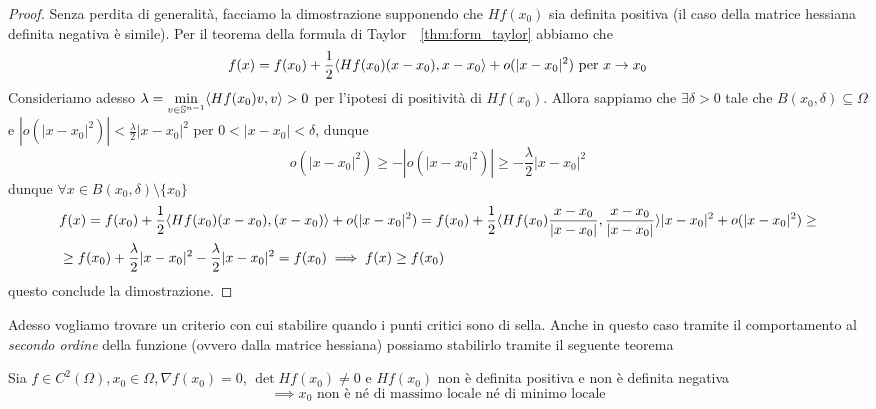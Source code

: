 \begin{proof} Senza perdita di generalità, facciamo la dimostrazione supponendo che $Hf(x_0)$ sia definita positiva (il caso della matrice hessiana definita negativa è simile). 
Per il teorema della formula di Taylor~~\ref{thm:form_taylor} abbiamo che
$$
f(x) = f(x_0) + \frac{1}{2} \langle Hf(x_0)(x-x_0), x-x_0 \rangle + o(|x-x_0|^2) \text{ per } x \to x_0
$$
Consideriamo adesso $\lambda = \min\limits_{v \in \mathbb{S}^{n-1}} \langle Hf(x_0)v, v \rangle > 0$ per l'ipotesi di positività di $Hf(x_0)$. Allora sappiamo che $\exists \delta > 0$ tale che $B(x_0, \delta) \subseteq \Omega$ e $|o(|x-x_0|^2)| < \frac{\lambda}{2}|x-x_0|^2$ per $0 < |x-x_0| < \delta$, dunque
$$
o(|x-x_0|^2) \geq -|o(|x-x_0|^2)| \geq -\frac{\lambda}{2}|x-x_0|^2
$$
dunque $\forall x \in B(x_0, \delta) \setminus \{ x_0 \}$
\begin{align*}
&f(x) = f(x_0) + \frac{1}{2}\langle Hf(x_0)(x-x_0), (x-x_0) \rangle + o(|x-x_0|^2) = f(x_0) + \frac{1}{2} \langle Hf(x_0)\frac{x-x_0}{|x-x_0|}, \frac{x-x_0}{|x-x_0|} \rangle|x-x_0|^2 + o(|x-x_0|^2) \geq \\
&\geq f(x_0) + \frac{\lambda}{2}|x-x_0|^2 - \frac{\lambda}{2}|x-x_0|^2 = f(x_0) \implies f(x) \geq f(x_0)
\end{align*}
questo conclude la dimostrazione.
\end{proof}
Adesso vogliamo trovare un criterio con cui stabilire quando i punti critici sono di sella. Anche in questo caso tramite il comportamento al \emph{secondo ordine} della funzione (ovvero dalla matrice hessiana) possiamo stabilirlo tramite il seguente teorema
\begin{theorem}
Sia $f \in C^2(\Omega), x_0 \in \Omega, \nabla f(x_0) = 0$, $\det{Hf(x_0)} \neq 0$ e $Hf(x_0)$ non è definita positiva e non è definita negativa
$$
\implies x_0 \text{ non è né di massimo locale né di minimo locale}
$$
\end{theorem}

